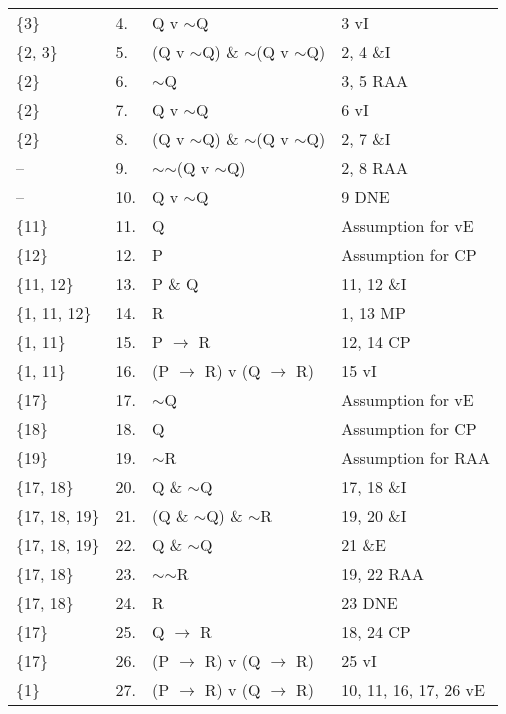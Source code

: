 \documentclass[a4paper,12pt]{article}
\newcommand{\mra}{$\rightarrow$ }
\newcommand{\ms}{$\sim$}
\begin{document}
\begin{enumerate}[label=\arabic*,leftmargin=*]
\begin{enumerate}[label=\arabic*.]
\begin{minipage}{\textwidth}
\begin{tabular}{l l l l}
                        \{3\} & 4. & Q v \ms Q & 3 vI\\
                        \{2, 3\} & 5. & (Q v \ms Q) \& \ms (Q v \ms Q) & 2, 4 \&I\\
                        \{2\} & 6. & \ms Q & 3, 5 RAA\\
                        \{2\} & 7. & Q v \ms Q & 6 vI\\
                        \{2\} & 8. & (Q v \ms Q) \& \ms (Q v \ms Q) & 2, 7 \&I\\
                        -- & 9. & \ms \ms (Q v \ms Q) & 2, 8 RAA\\
                        -- & 10. & Q v \ms Q & 9 DNE\\
                        \{11\} & 11. & Q & Assumption for vE\\
                        \{12\} & 12. & P & Assumption for CP\\
                        \{11, 12\} & 13. & P \& Q & 11, 12 \&I\\
                        \{1, 11, 12\} & 14. & R & 1, 13 MP\\
                        \{1, 11\} & 15. & P \mra R & 12, 14 CP\\
                        \{1, 11\} & 16. & (P \mra R) v (Q \mra R) & 15 vI\\
                        \{17\} & 17. & \ms Q & Assumption for vE\\
                        \{18\} & 18. & Q & Assumption for CP\\
                        \{19\} & 19. & \ms R & Assumption for RAA\\
                        \{17, 18\} & 20. & Q \& \ms Q & 17, 18 \&I\\
                        \{17, 18, 19\} & 21. & (Q \& \ms Q) \& \ms R & 19, 20 \&I\\
                        \{17, 18, 19\} & 22. & Q \& \ms Q & 21 \&E\\
                        \{17, 18\} & 23. & \ms \ms R & 19, 22 RAA\\
                        \{17, 18\} & 24. & R & 23 DNE\\
                        \{17\} & 25. & Q \mra R & 18, 24 CP\\
                        \{17\} & 26. & (P \mra R) v (Q \mra R) & 25 vI\\
                        \{1\} & 27. & (P \mra R) v (Q \mra R) & 10, 11, 16, 17, 26 vE\\
                    \end{tabular}
                \end{minipage}

        \end{enumerate}
    \end{enumerate}
\end{document}
